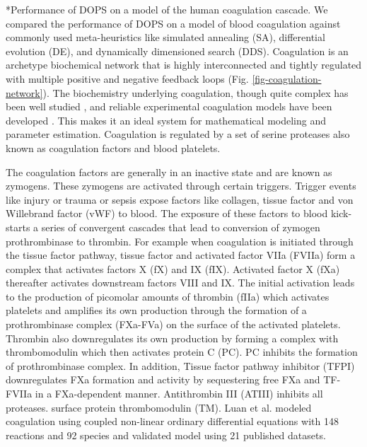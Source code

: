 \documentclass[12pt]{article}
\makeatletter
\renewcommand\subsection{\@startsection
	{subsection}{2}{0mm}
	{-0.05in}
	{-0.5\baselineskip}
	{\normalfont\normalsize\bfseries}}
\makeatother
\begin{document}
\subsection*{Performance of DOPS on a model of the human coagulation cascade.}
We compared the performance of DOPS on a model of blood coagulation against commonly used meta-heuristics like simulated annealing (SA), differential evolution (DE), and dynamically dimensioned search (DDS). Coagulation is an archetype biochemical network that is highly interconnected and tightly regulated with multiple positive and negative feedback loops (Fig. \ref{fig-coagulation-network}). The biochemistry underlying coagulation, though quite complex has been well studied \cite{mann2003dynamics,mann2003all,mann2003thrombin,vogler2009contact,diamond2013systems,fogelson2005coagulation,anand2003model}, and reliable experimental coagulation models have been developed \cite{hockin2002model,chatterjee2010systems,mann2006models,luan2007computationally}. This makes it an ideal system for mathematical modeling and parameter estimation. Coagulation is regulated by a set of serine proteases also known as coagulation factors and blood platelets.

The coagulation factors are generally in an inactive state and are known as zymogens. These zymogens are activated through certain triggers. Trigger events like injury or trauma or sepsis expose factors like collagen, tissue factor and von Willebrand factor (vWF) to blood. The exposure of these factors to blood kick-starts a series of convergent cascades that lead to conversion of zymogen prothrombinase to thrombin.  For example when coagulation is initiated through the tissue factor pathway, tissue factor and activated factor VIIa (FVIIa) form a complex that activates factors X (fX) and IX (fIX). Activated factor X (fXa) thereafter activates downstream factors VIII and IX. The initial activation leads to the production of picomolar amounts of thrombin (fIIa) which activates platelets and amplifies its own production through the formation of a prothrombinase complex (FXa-FVa) on the surface of the activated platelets. Thrombin also  downregulates its own production by forming a complex with thrombomodulin which then activates protein C (PC). PC inhibits the formation of prothrombinase complex. In addition, Tissue factor pathway inhibitor (TFPI) downregulates FXa formation and activity by sequestering free FXa and TF-FVIIa in a FXa-dependent manner. Antithrombin III (ATIII)  inhibits all proteases. surface protein thrombomodulin (TM). Luan et al. modeled coagulation using coupled non-linear ordinary differential equations with 148 reactions and 92 species \cite{luan2007computationally} and validated model using 21 published datasets.
\end{document}
